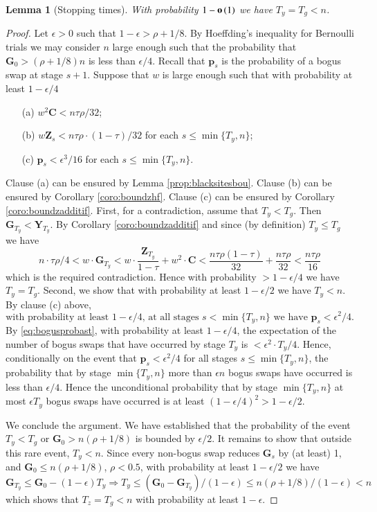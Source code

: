 \documentclass[11pt]{article}
\theoremstyle{plain}
\newtheorem{lem}[thm]{Lemma}
\numberwithin{equation}{subsection}
\newcommand{\smo}[1]{\mathop{\bf o}\/\left({#1}\right)}
\newcommand{\ZZ}{\mathbf{Z}}
\newcommand{\GG}{\mathbf{G}}
\newcommand{\YY}{\mathbf{Y}}
\newcommand{\CC}{\mathbf{C}}
\newcommand{\pp}{\mathbf{p}}
\begin{document}
\begin{lem}[Stopping times]\label{le:stoptimefin}
With probability $1-\smo{1}$ we have $T_y=T_g<n$.
\end{lem}
\begin{proof}
Let $\epsilon>0$ such that $1-\epsilon> \rho+1/8$. 
By Hoeffding's inequality for Bernoulli trials 
we may consider $n$ large enough such that
the probability that $\GG_0>(\rho+1/8) n$ is less than $\epsilon/4$.
Recall that $\pp_s$ is the
probability of a bogus swap at stage $s+1$.
Suppose that $w$ is large enough such that with probability at least $1-\epsilon/4$
\begin{itemize}
\item[(a)] $w^2\CC<n\tau\rho/32$;
\item[(b)] $w\ZZ_{s}< n\tau\rho\cdot  (1-\tau)/32$ for each $s\leq \min\{T_y, n\}$;
\item[(c)] $\pp_s<\epsilon^3/16$ for each $s\leq \min\{T_y, n\}$.
\end{itemize}
Clause (a) can be ensured 
by Lemma \ref{prop:blacksitesbou}. 
Clause (b) 
can be ensured 
by Corollary \ref{coro:boundzhf}.
Clause (c) can be ensured 
by Corollary \ref{coro:boundzadditif}.
First, for a contradiction, assume that 
$T_y<T_g$. Then  $\GG_{T_y}< \YY_{T_y}$.
By Corollary \ref{coro:boundzadditif} and since (by definition) 
$T_y\leq T_g$ we have
\[
n\cdot \tau\rho/4 < w\cdot \GG_{T_y}< w\cdot 
\frac{\ZZ_{T_y}}{1-\tau}+w^2\cdot \CC
< \frac{n\tau\rho(1-\tau)}{32} + \frac{n\tau\rho}{32}< \frac{n\tau\rho}{16}
\]
which is the required contradiction.
Hence with probability $>1-\epsilon/4$ we have
$T_y=T_g$.
Second, we show that with probability at least $1-\epsilon/2$
we have $T_y< n$. By clause (c) above, 
\begin{equation}\label{eq:bogusprobast}
\textrm{with probability at least $1-\epsilon/4$,
at all stages $s<\min\{T_y,n\}$  
we have $\pp_s <\epsilon^2/4$.}
\end{equation}
By \eqref{eq:bogusprobast}, with probability at least $1-\epsilon/4$,
the expectation of the number of bogus swaps
that have occurred by stage $T_y$ is $<\epsilon^2\cdot T_y/4$. 
Hence, conditionally on the event that $\pp_s <\epsilon^2/4$ for all stages
$s\leq \min\{T_y, n\}$,
 the  
probability that by stage $\min\{T_y, n\}$
more than $\epsilon n$ bogus swaps have occurred
is less than $\epsilon/4$. 
Hence the unconditional probability that 
by stage $\min\{T_y, n\}$ at most 
$\epsilon T_y$ bogus swaps have occurred
is at least $(1-\epsilon/4)^2>1-\epsilon/2$.

We conclude the argument. We have established that the probability 
of the event $T_y<T_g$ or $\GG_0>n(\rho+1/8)$ is bounded by $\epsilon/2$.
It remains to show that outside this rare event, $T_y<n$.
Since every non-bogus swap reduces $\GG_s$ by (at least) 1, and 
$\GG_0\leq n(\rho+1/8)$, $\rho<0.5$,
with probability at least
$1-\epsilon/2$ we have
\[
\GG_{T_y}\leq \GG_0-(1-\epsilon) T_y
\Rightarrow
T_y\leq (\GG_0-\GG_{T_y})/(1-\epsilon)\leq n(\rho+1/8)/(1-\epsilon)<n
\]
which shows that
$T_z=T_g<n$ with probability at least $1-\epsilon$.
\end{proof}
\end{document}
